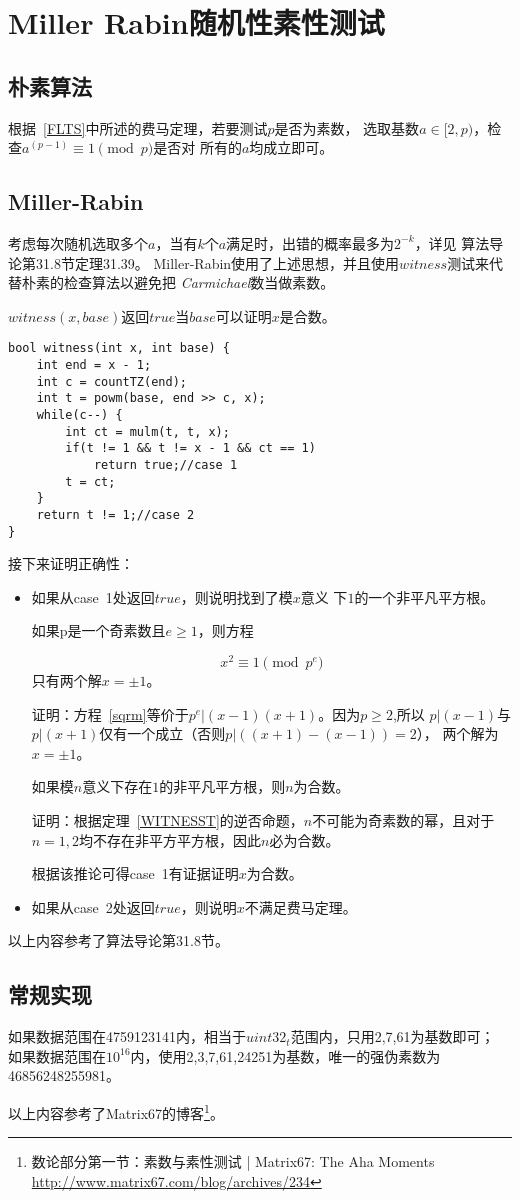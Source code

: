 \section{Miller Rabin随机性素性测试}
\subsection{朴素算法}
根据~\ref{FLTS}中所述的费马定理，若要测试$p$是否为素数，
选取基数$a\in [2,p)$，检查$a^(p-1)\equiv 1 \pmod{p}$是否对
所有的$a$均成立即可。
\subsection{Miller-Rabin}
考虑每次随机选取多个$a$，当有$k$个$a$满足时，出错的概率最多为$2^{-k}$，详见
算法导论\cite{ITA3}第31.8节定理31.39。
Miller-Rabin使用了上述思想，并且使用$witness$测试来代替朴素的检查算法以避免把
\emph{Carmichael}数当做素数。

$witness(x,base)$返回$true$当$base$可以证明$x$是合数。
\begin{lstlisting}[title=witness]
bool witness(int x, int base) {
    int end = x - 1;
    int c = countTZ(end);
    int t = powm(base, end >> c, x);
    while(c--) {
        int ct = mulm(t, t, x);
        if(t != 1 && t != x - 1 && ct == 1)
            return true;//case 1
        t = ct;
    }
    return t != 1;//case 2
}
\end{lstlisting}
接下来证明正确性：
\begin{itemize}
	\item 如果从case~1处返回$true$，则说明找到了模$x$意义
            下$1$的一个非平凡平方根。

          \begin{theorem}\label{WITNESST}
              如果p是一个奇素数且$e\geq 1$，则方程

              \begin{equation}\label{sqrm}
                   x^2 \equiv 1 \pmod{p^e}
              \end{equation}
              只有两个解$x=\pm 1$。
	      \end{theorem}

          证明：方程~\ref{sqrm}等价于$p^e|(x-1)(x+1)$。因为$p \ge 2$,所以
          $p|(x-1)$与$p|(x+1)$仅有一个成立（否则$p|((x+1)-(x-1))=2$），
          两个解为$x=\pm 1$。

	      \begin{inference}
		      如果模$n$意义下存在$1$的非平凡平方根，则$n$为合数。
	      \end{inference}

	      证明：根据定理~\ref{WITNESST}的逆否命题，$n$不可能为奇素数的幂，且对于
	      $n=1,2$均不存在非平方平方根，因此$n$必为合数。

	      根据该推论可得case~1有证据证明$x$为合数。
	\item 如果从case~2处返回$true$，则说明$x$不满足费马定理。
\end{itemize}
以上内容参考了算法导论\cite{ITA3}第31.8节。
\subsection{常规实现}
如果数据范围在4759123141内，相当于$uint32_t$范围内，只用2,7,61为基数即可；
如果数据范围在$10^{16}$内，使用2,3,7,61,24251为基数，唯一的强伪素数为
46856248255981。

以上内容参考了Matrix67的博客\footnote{
	数论部分第一节：素数与素性测试 | Matrix67: The Aha Moments
	\url{http://www.matrix67.com/blog/archives/234}}。
